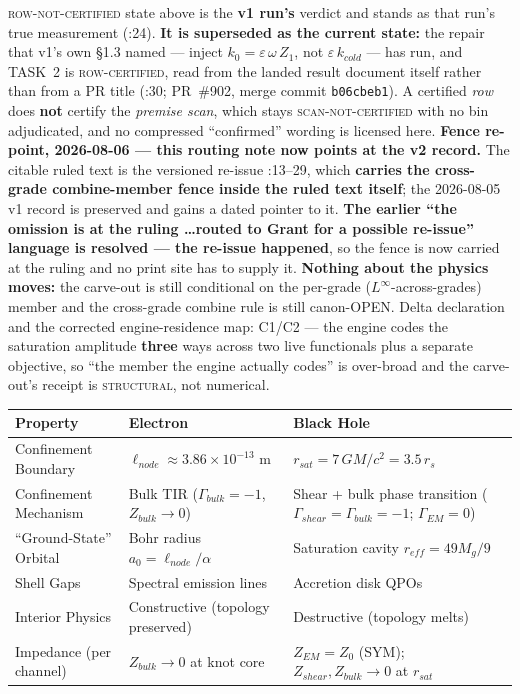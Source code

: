 \textsc{row-not-certified} state above is the \textbf{v1 run's} verdict and stands as that run's true measurement (:24). \textbf{It is superseded as the current state:} the repair that v1's own \S1.3 named --- inject $k_0 = \varepsilon\,\omega\,Z_1$, not $\varepsilon\,k_{cold}$ --- has run, and TASK~2 is \textsc{row-certified}, read from the landed result document itself rather than from a PR title (:30; PR~\#902, merge commit \texttt{b06cbeb1}). A certified \emph{row} does \textbf{not} certify the \emph{premise scan}, which stays \textsc{scan-not-certified} with no bin adjudicated, and no compressed ``confirmed'' wording is licensed here. \textbf{Fence re-point, 2026-08-06 --- this routing note now points at the v2 record.} The citable ruled text is the versioned re-issue :13--29, which \textbf{carries the cross-grade combine-member fence inside the ruled text itself}; the 2026-08-05 v1 record is preserved and gains a dated pointer to it. \textbf{The earlier ``the omission is at the ruling \ldots routed to Grant for a possible re-issue'' language is resolved --- the re-issue happened}, so the fence is now carried at the ruling and no print site has to supply it. \textbf{Nothing about the physics moves:} the carve-out is still conditional on the per-grade ($L^\infty$-across-grades) member and the cross-grade combine rule is still canon-OPEN. Delta declaration and the corrected engine-residence map:  C1/C2 --- the engine codes the saturation amplitude \textbf{three} ways across two live functionals plus a separate objective, so ``the member the engine actually codes'' is over-broad and the carve-out's receipt is \textsc{structural}, not numerical.

\begin{center}
\renewcommand{\arraystretch}{1.3}
\begin{tabularx}{\textwidth}{@{}l l X@{}}
\toprule
\textbf{Property} & \textbf{Electron} & \textbf{Black Hole} \\
\midrule
Confinement Boundary & $\ell_{node} \approx 3.86 \times 10^{-13}$ m & $r_{sat} = 7\,GM/c^2 = 3.5\,r_s$ \\
Confinement Mechanism & Bulk TIR ($\Gamma_{bulk} = -1$, $Z_{bulk} \to 0$) & Shear + bulk phase transition ($\Gamma_{shear} = \Gamma_{bulk} = -1$; $\Gamma_{EM} = 0$) \\
``Ground-State'' Orbital & Bohr radius $a_0 = \ell_{node}/\alpha$ & Saturation cavity $r_{eff} = 49M_g/9$ \\
Shell Gaps & Spectral emission lines & Accretion disk QPOs \\
Interior Physics & Constructive (topology preserved) & Destructive (topology melts) \\
Impedance (per channel) & $Z_{bulk} \to 0$ at knot core & $Z_{EM} = Z_0$ (SYM); $Z_{shear}, Z_{bulk} \to 0$ at $r_{sat}$ \\
\bottomrule
\end{tabularx}
\end{center}


